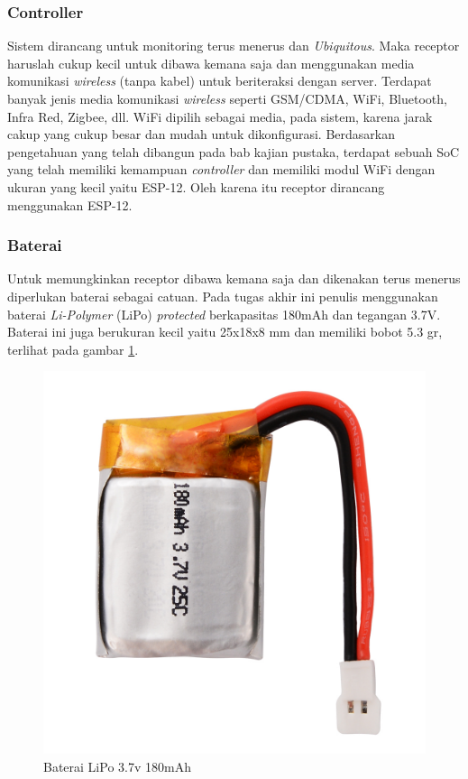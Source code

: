 \subsubsection{Controller}
Sistem dirancang untuk monitoring terus menerus dan \textit{Ubiquitous}. Maka receptor haruslah cukup kecil untuk dibawa kemana saja dan menggunakan media komunikasi \textit{wireless} (tanpa kabel) untuk beriteraksi dengan server. Terdapat banyak jenis media komunikasi \textit{wireless} seperti GSM/CDMA, WiFi, Bluetooth, Infra Red, Zigbee, dll. WiFi dipilih sebagai media, pada sistem, karena jarak cakup yang cukup besar dan mudah untuk dikonfigurasi. Berdasarkan pengetahuan yang telah dibangun pada bab kajian pustaka, terdapat sebuah SoC yang telah memiliki kemampuan \textit{controller} dan memiliki modul WiFi dengan ukuran yang kecil yaitu ESP-12. Oleh karena itu receptor dirancang menggunakan ESP-12.

\subsubsection{Baterai}
Untuk memungkinkan receptor dibawa kemana saja dan dikenakan terus menerus diperlukan baterai sebagai catuan. Pada tugas akhir ini penulis menggunakan baterai \textit{Li-Polymer} (LiPo) \textit{protected} berkapasitas 180mAh dan tegangan 3.7V. Baterai ini juga berukuran kecil yaitu 25x18x8 mm dan memiliki bobot 5.3 gr, terlihat pada gambar \ref{fig:battery}.

\begin{figure}[H]
	\centering
	\includegraphics[scale=0.14]{images/baterai.jpg}
	\caption{Baterai LiPo 3.7v 180mAh}
	\label{fig:battery}
\end{figure}

